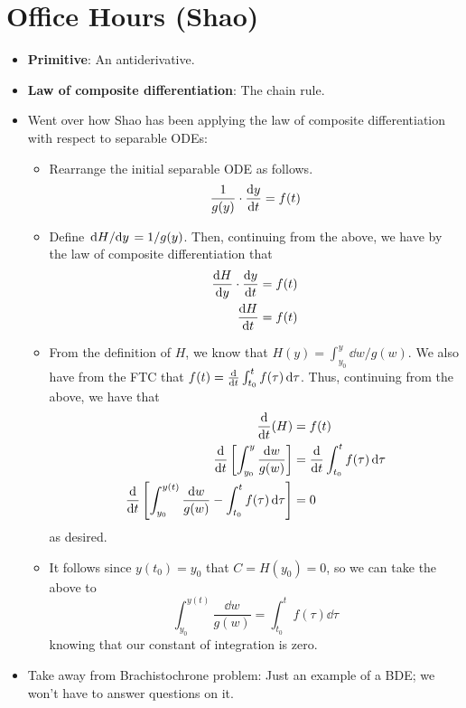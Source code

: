 \documentclass[../notes.tex]{subfiles}
\begin{document}
\section{Office Hours (Shao)}
\begin{itemize}
    \item \textbf{Primitive}: An antiderivative.
    \item \textbf{Law of composite differentiation}: The chain rule.
    \item Went over how Shao has been applying the law of composite differentiation with respect to separable ODEs:
    \begin{itemize}
        \item Rearrange the initial separable ODE as follows.
        \begin{equation*}
            \frac{1}{g(y)}\cdot\dv{y}{t} = f(t)
        \end{equation*}
        \item Define $\dv*{H}{y}=1/g(y)$. Then, continuing from the above, we have by the law of composite differentiation that
        \begin{align*}
            \dv{H}{y}\cdot\dv{y}{t} &= f(t)\\
            \dv{H}{t} &= f(t)
        \end{align*}
        \item From the definition of $H$, we know that $H(y)=\int_{y_0}^y\dd{w}/g(w)$. We also have from the FTC that $f(t)=\dv{t}\int_{t_0}^tf(\tau)\dd{\tau}$. Thus, continuing from the above, we have that
        \begin{align*}
            \dv{t}(H) &= f(t)\\
            \dv{t}\left[ \int_{y_0}^y\frac{\dd{w}}{g(w)} \right] &= \dv{t}\int_{t_0}^tf(\tau)\dd{\tau}\\
            \dv{t}\left[ \int_{y_0}^{y(t)}\frac{\dd{w}}{g(w)}-\int_{t_0}^tf(\tau)\dd{\tau} \right] &= 0
        \end{align*}
        as desired.
        \item It follows since $y(t_0)=y_0$ that $C=H(y_0)=0$, so we can take the above to
        \begin{equation*}
            \int_{y_0}^{y(t)}\frac{\dd{w}}{g(w)} = \int_{t_0}^tf(\tau)\dd{\tau}
        \end{equation*}
        knowing that our constant of integration is zero.
    \end{itemize}
    \item Take away from Brachistochrone problem: Just an example of a BDE; we won't have to answer questions on it.
\end{itemize}
\end{document}
